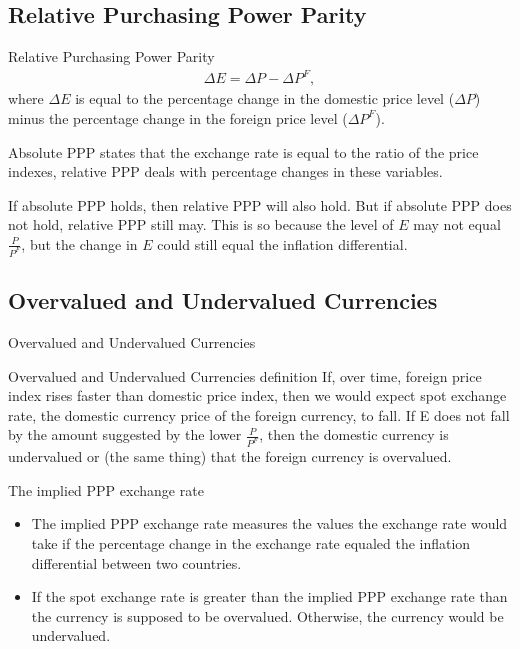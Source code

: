 \documentclass[international_finance_p2.tex]{subfiles}
\begin{document}
\subsection{Relative Purchasing Power Parity}
\begin{frame}{Relative Purchasing Power Parity}
\begin{align}
\Delta E=\Delta P- \Delta P^F,
\end{align}
where 
$\Delta E$ is equal to the percentage change in the domestic price level ($\Delta P$) minus the percentage change in the foreign price level ($\Delta P^F$).

Absolute PPP states that the exchange rate is equal to the ratio of the price indexes, relative PPP deals with percentage changes in these variables.

If absolute PPP holds, then relative PPP will also hold. But if absolute PPP does not hold, relative PPP still may. This is so because the level of $E$ may not equal $\frac{P}{P^F}$, but the change in $E$ could still equal the inflation differential.
\end{frame}

\subsection{Overvalued and Undervalued Currencies}
\begin{frame}{Overvalued and Undervalued Currencies}
\begin{block}{Overvalued and Undervalued Currencies definition}
\quad If, over time, foreign price index rises faster than domestic price index, then we would expect spot exchange rate, the domestic currency price of the foreign currency, to fall. If E does not fall by the amount suggested by the lower $\frac{P}{P^F}$, then the domestic currency is undervalued or (the same thing) that the foreign currency is overvalued.
\end{block}
\end{frame}
\begin{frame}{The implied PPP exchange rate}
\begin{itemize}[<+->]
\item
The implied PPP exchange rate measures the values the exchange rate would take if the percentage change in the exchange rate equaled the inflation differential between two countries. 
\item
If the spot exchange rate is greater than the implied PPP exchange rate than the currency is supposed to be overvalued. Otherwise, the currency would be undervalued.
\end{itemize}
\end{frame}
\end{document}

